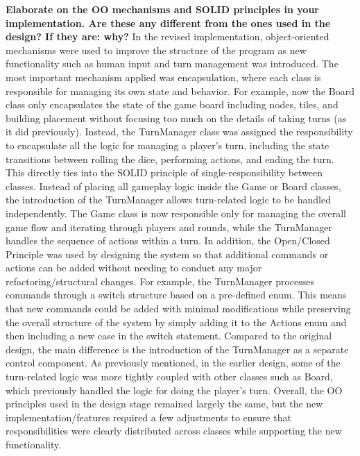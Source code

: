 \textbf{Elaborate on the OO mechanisms and SOLID principles in your implementation. Are these any different from the ones used in the design? If they are: why?}
\newline \newline
In the revised implementation, object-oriented mechanisms were used to improve the structure of the program as new functionality such as human input and turn management was introduced. The most important mechanism applied was encapsulation, where each class is responsible for managing its own state and behavior. For example, now the Board class only encapsulates the state of the game board including nodes, tiles, and building placement without focusing too much on the details of taking turns (as it did previously). 
\newline \newline
Instead, the TurnManager class was assigned the responsibility to encapsulate all the logic for managing a player’s turn, including the state transitions between rolling the dice, performing actions, and ending the turn. This directly ties into the SOLID principle of single-responsibility between classes. Instead of placing all gameplay logic inside the Game or Board classes, the introduction of the TurnManager allows turn-related logic to be handled independently. The Game class is now responsible only for managing the overall game flow and iterating through players and rounds, while the TurnManager handles the sequence of actions within a turn.
\newline \newline
In addition, the Open/Closed Principle was used by designing the system so that additional commands or actions can be added without needing to conduct any major refactoring/structural changes. For example, the TurnManager processes commands through a switch structure based on a pre-defined enum. This means that new commands could be added with minimal modifications while preserving the overall structure of the system by simply adding it to the Actions enum and then including a new case in the switch statement.
\newline \newline
Compared to the original design, the main difference is the introduction of the TurnManager as a separate control component. As previously mentioned, in the earlier design, some of the turn-related logic was more tightly coupled with other classes such as Board, which previously handled the logic for doing the player’s turn. Overall, the OO principles used in the design stage remained largely the same, but the new implementation/features required a few adjustments to ensure that responsibilities were clearly distributed across classes while supporting the new functionality.
\newline

